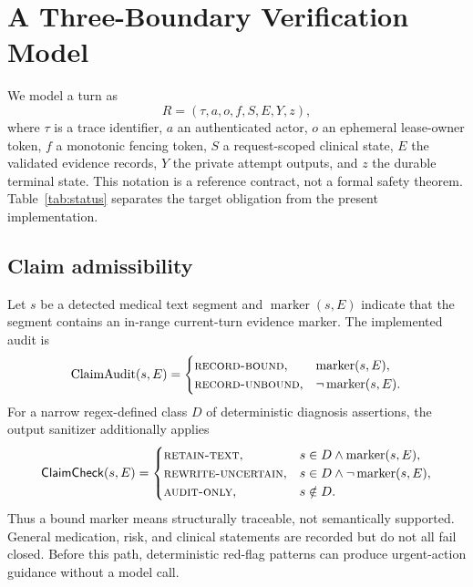 \section{A Three-Boundary Verification Model}
\label{sec:model}

We model a turn as
\begin{equation}
R=(\tau, a, o, f, S, E, Y, z),
\end{equation}
where $\tau$ is a trace identifier, $a$ an authenticated actor, $o$ an
ephemeral lease-owner token, $f$ a monotonic fencing token, $S$ a
request-scoped clinical state, $E$ the validated evidence records, $Y$ the
private attempt outputs, and $z$ the durable terminal state.  This notation is
a reference contract, not a formal safety theorem.  Table~\ref{tab:status}
separates the target obligation from the present implementation.

\subsection{Claim admissibility}

Let $s$ be a detected medical text segment and
$\operatorname{marker}(s,E)$ indicate that the segment contains an in-range
current-turn evidence marker.  The implemented audit is
\begin{equation}
\operatorname{ClaimAudit}(s,E)=
\begin{cases}
\textsc{record-bound}, & \operatorname{marker}(s,E),\\
\textsc{record-unbound}, & \neg\operatorname{marker}(s,E).
\end{cases}
\end{equation}
For a narrow regex-defined class $D$ of deterministic diagnosis assertions,
the output sanitizer additionally applies
\begin{equation}
\mathsf{ClaimCheck}(s,E)=
\begin{cases}
\textsc{retain-text}, & s\in D\wedge\operatorname{marker}(s,E),\\
\textsc{rewrite-uncertain}, & s\in D\wedge\neg\operatorname{marker}(s,E),\\
\textsc{audit-only}, & s\notin D.
\end{cases}
\end{equation}
Thus a bound marker means structurally traceable, not semantically supported.
General medication, risk, and clinical statements are recorded but do not all
fail closed.  Before this path, deterministic red-flag patterns can produce
urgent-action guidance without a model call.


